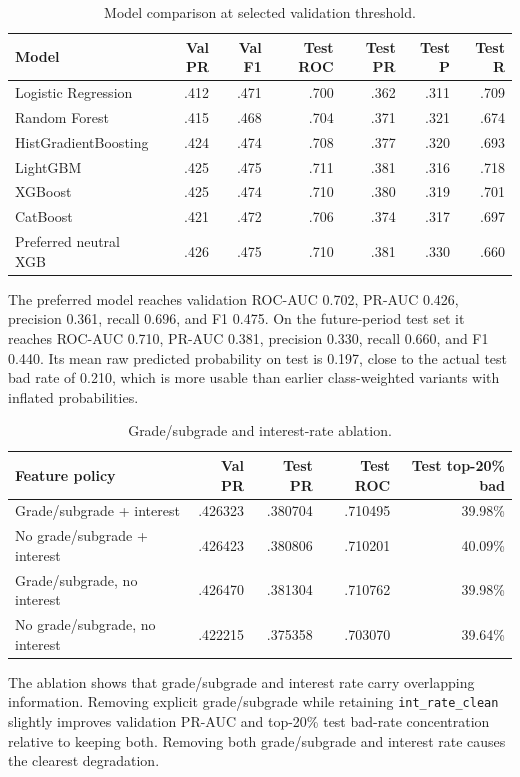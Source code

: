 \documentclass[11pt]{article}
\begin{document}
\begin{table}[h]
\centering
\small
\caption{Model comparison at selected validation threshold.}
\label{tab:model-results}
\begin{tabular}{lrrrrrr}
\toprule
Model & Val PR & Val F1 & Test ROC & Test PR & Test P & Test R\\
\midrule
Logistic Regression & .412 & .471 & .700 & .362 & .311 & .709\\
Random Forest & .415 & .468 & .704 & .371 & .321 & .674\\
HistGradientBoosting & .424 & .474 & .708 & .377 & .320 & .693\\
LightGBM & .425 & .475 & .711 & .381 & .316 & .718\\
XGBoost & .425 & .474 & .710 & .380 & .319 & .701\\
CatBoost & .421 & .472 & .706 & .374 & .317 & .697\\
Preferred neutral XGB & .426 & .475 & .710 & .381 & .330 & .660\\
\bottomrule
\end{tabular}
\end{table}

The preferred model reaches validation ROC-AUC 0.702, PR-AUC 0.426, precision 0.361, recall 0.696, and F1 0.475. On the future-period test set it reaches ROC-AUC 0.710, PR-AUC 0.381, precision 0.330, recall 0.660, and F1 0.440. Its mean raw predicted probability on test is 0.197, close to the actual test bad rate of 0.210, which is more usable than earlier class-weighted variants with inflated probabilities.

\begin{table}[h]
\centering
\small
\caption{Grade/subgrade and interest-rate ablation.}
\label{tab:ablation}
\begin{tabular}{lrrrr}
\toprule
Feature policy & Val PR & Test PR & Test ROC & Test top-20\% bad\\
\midrule
Grade/subgrade + interest & .426323 & .380704 & .710495 & 39.98\%\\
No grade/subgrade + interest & .426423 & .380806 & .710201 & 40.09\%\\
Grade/subgrade, no interest & .426470 & .381304 & .710762 & 39.98\%\\
No grade/subgrade, no interest & .422215 & .375358 & .703070 & 39.64\%\\
\bottomrule
\end{tabular}
\end{table}

The ablation shows that grade/subgrade and interest rate carry overlapping information. Removing explicit grade/subgrade while retaining \texttt{int\_rate\_clean} slightly improves validation PR-AUC and top-20\% test bad-rate concentration relative to keeping both. Removing both grade/subgrade and interest rate causes the clearest degradation.
\end{document}
